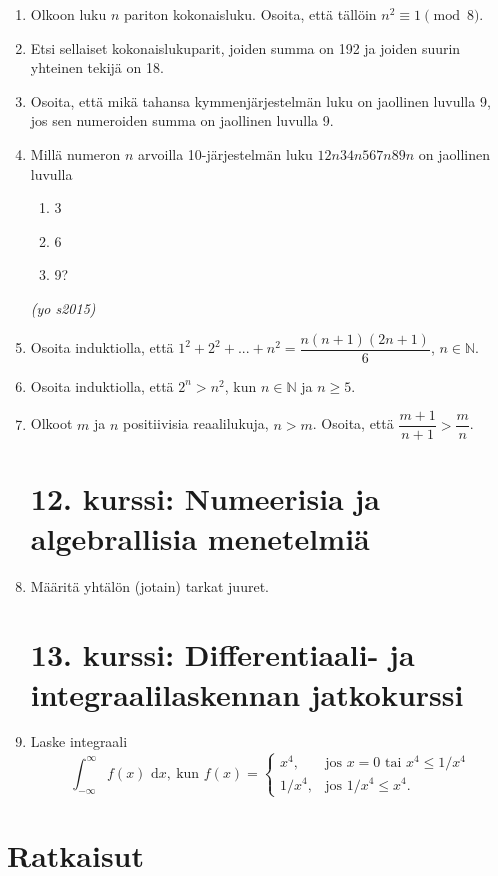 \documentclass[12pt,fleqn]{article}
\begin{document}
\begin{enumerate}[label=\textbf{\arabic*.}]
\item Olkoon luku \(n\) pariton kokonaisluku. Osoita, että tällöin \(n^2 \equiv 1 \pmod{8}\).

\item Etsi sellaiset kokonaislukuparit, joiden summa on 192 ja joiden suurin yhteinen tekijä on 18.
\item Osoita, että mikä tahansa kymmenjärjestelmän luku on jaollinen luvulla 9, jos sen numeroiden summa on jaollinen luvulla 9.
\item Millä numeron \(n\) arvoilla 10-järjestelmän luku \(12n34n567n89n\) on jaollinen luvulla
\begin{enumerate}[label=\textbf{\alph*)}]
\item 3
\item 6
\item 9?
\end{enumerate}
\emph{(yo s2015)}

\item Osoita induktiolla, että \(1^2+2^2+...+n^2=\dfrac{n(n+1)(2n+1)}{6}\), \(n \in \mathbb {N}\).

\item Osoita induktiolla, että \(2^n>n^2\), kun \(n\in \mathbb{N}\) ja \(n\geq 5\).

\item Olkoot \(m\) ja \(n\) positiivisia reaalilukuja, \(n>m\). Osoita, että \(\dfrac{m+1}{n+1}>\dfrac{m}{n}\).
\newpage
\section*{12. kurssi: Numeerisia ja algebrallisia menetelmiä}
\item Määritä yhtälön (jotain) tarkat juuret.

\newpage
\section*{13. kurssi: Differentiaali- ja integraalilaskennan jatkokurssi}
\item Laske integraali $$\int_{-\infty}^{\infty} f(x)\text{ d}x, \ \text{kun }f(x)=\begin{cases} x^4, &\text{jos }x=0\text{ tai }x^4\leq 1/x^4 \\ 1/x^4, &\text{jos }1/x^4\leq x^4. \end{cases}$$

\end{enumerate}

\newpage
\section*{Ratkaisut}
\end{document}

